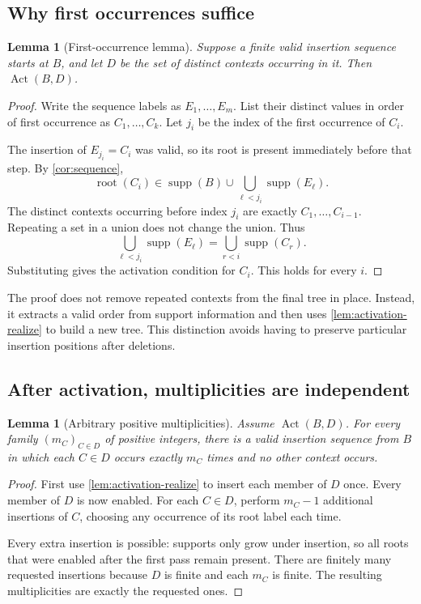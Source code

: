 \documentclass[11pt,a4paper]{article}
\numberwithin{equation}{section}
\theoremstyle{plain}
\newtheorem{lemma}[theorem]{Lemma}
\theoremstyle{definition}
\theoremstyle{remark}
\newcommand{\supp}{\operatorname{supp}}
\newcommand{\rt}{\operatorname{root}}
\newcommand{\Act}{\operatorname{Act}}
\begin{document}
\subsection{Why first occurrences suffice}
\begin{lemma}[First-occurrence lemma]\label{lem:first-occurrence}
Suppose a finite valid insertion sequence starts at $B$, and let $D$ be the set of distinct contexts occurring in it. Then $\Act(B,D)$.
\end{lemma}
\begin{proof}
Write the sequence labels as $E_1,\ldots,E_m$. List their distinct values in order of first occurrence as $C_1,\ldots,C_k$. Let $j_i$ be the index of the first occurrence of $C_i$.

The insertion of $E_{j_i}=C_i$ was valid, so its root is present immediately before that step. By \cref{cor:sequence},
\[
\rt(C_i)\in\supp(B)\cup\bigcup_{\ell<j_i}\supp(E_\ell).
\]
The distinct contexts occurring before index $j_i$ are exactly $C_1,\ldots,C_{i-1}$. Repeating a set in a union does not change the union. Thus
\[
\bigcup_{\ell<j_i}\supp(E_\ell)=\bigcup_{r<i}\supp(C_r).
\]
Substituting gives the activation condition for $C_i$. This holds for every $i$.
\end{proof}

The proof does not remove repeated contexts from the final tree in place. Instead, it extracts a valid order from support information and then uses \cref{lem:activation-realize} to build a new tree. This distinction avoids having to preserve particular insertion positions after deletions.

\subsection{After activation, multiplicities are independent}
\begin{lemma}[Arbitrary positive multiplicities]\label{lem:multiplicities}
Assume $\Act(B,D)$. For every family $(m_C)_{C\in D}$ of positive integers, there is a valid insertion sequence from $B$ in which each $C\in D$ occurs exactly $m_C$ times and no other context occurs.
\end{lemma}
\begin{proof}
First use \cref{lem:activation-realize} to insert each member of $D$ once. Every member of $D$ is now enabled. For each $C\in D$, perform $m_C-1$ additional insertions of $C$, choosing any occurrence of its root label each time.

Every extra insertion is possible: supports only grow under insertion, so all roots that were enabled after the first pass remain present. There are finitely many requested insertions because $D$ is finite and each $m_C$ is finite. The resulting multiplicities are exactly the requested ones.
\end{proof}
\end{document}
